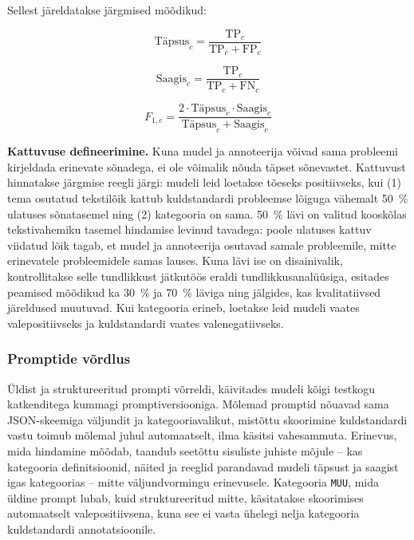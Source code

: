 Sellest järeldatakse järgmised mõõdikud:

\begin{equation}
    \text{Täpsus}_c = \frac{\text{TP}_c}{\text{TP}_c + \text{FP}_c}
    \label{eq:tapsus}
\end{equation}

\begin{equation}
    \text{Saagis}_c = \frac{\text{TP}_c}{\text{TP}_c + \text{FN}_c}
    \label{eq:saagis}
\end{equation}

\begin{equation}
    F_{1,c} = \frac{2 \cdot \text{Täpsus}_c \cdot \text{Saagis}_c}{\text{Täpsus}_c + \text{Saagis}_c}
    \label{eq:f1}
\end{equation}

\textbf{Kattuvuse defineerimine.} Kuna mudel ja annoteerija võivad sama probleemi kirjeldada erinevate sõnadega, ei ole võimalik nõuda täpset sõnevastet. Kattuvust hinnatakse järgmise reegli järgi: mudeli leid loetakse tõeseks positiivseks, kui (1) tema osutatud tekstilõik kattub kuldstandardi probleemse lõiguga vähemalt 50~\% ulatuses sõnatasemel ning (2) kategooria on sama. 50~\% lävi on valitud kooskõlas tekstivahemiku tasemel hindamise levinud tavadega: poole ulatuses kattuv viidatud lõik tagab, et mudel ja annoteerija osutavad samale probleemile, mitte erinevatele probleemidele samas lauses. Kuna lävi ise on disainivalik, kontrollitakse selle tundlikkust jätkutöös eraldi tundlikkusanalüüsiga, esitades peamised mõõdikud ka 30~\% ja 70~\% läviga ning jälgides, kas kvalitatiivsed järeldused muutuvad. Kui kategooria erineb, loetakse leid mudeli vaates valepositiivseks ja kuldstandardi vaates valenegatiivseks.

\subsubsection{Promptide võrdlus}

Üldist ja struktureeritud prompti võrreldi, käivitades mudeli kõigi testkogu katkenditega kummagi promptiversiooniga. Mõlemad promptid nõuavad sama JSON-skeemiga väljundit ja kategooriavalikut, mistõttu skoorimine kuldstandardi vastu toimub mõlemal juhul automaatselt, ilma käsitsi vahesammuta. Erinevus, mida hindamine mõõdab, taandub seetõttu sisuliste juhiste mõjule -- kas kategooria definitsioonid, näited ja reeglid parandavad mudeli täpsust ja saagist igas kategoorias -- mitte väljundvormingu erinevusele. Kategooria \texttt{MUU}, mida üldine prompt lubab, kuid struktureeritud mitte, käsitatakse skoorimises automaatselt valepositiivsena, kuna see ei vasta ühelegi nelja kategooria kuldstandardi annotatsioonile.
